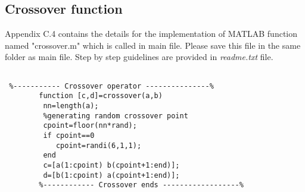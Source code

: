 \newpage
\subsection{Crossover function}
Appendix C.4 contains the details for the implementation of MATLAB function named "crossover.m" which is called in main file. Please save this file in the same folder as main file. Step by step guidelines are provided in \textit{readme.txt} file.\par

\begin{linenumbers}
\begin{lstlisting}

 %----------- Crossover operator ---------------%
        function [c,d]=crossover(a,b)
         nn=length(a);
         %generating random crossover point
         cpoint=floor(nn*rand);
         if cpoint==0
            cpoint=randi(6,1,1);
         end
         c=[a(1:cpoint) b(cpoint+1:end)];
         d=[b(1:cpoint) a(cpoint+1:end)];
        %------------ Crossover ends ------------------%
\end{lstlisting}
\end{linenumbers} 